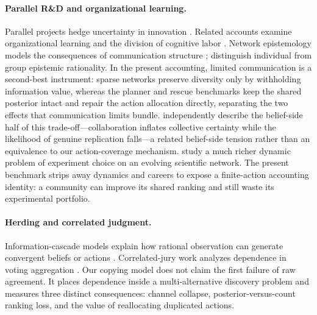 \documentclass[11pt]{article}
\theoremstyle{definition}
\theoremstyle{remark}
\newcommand{\1}{\mathbf{1}}
\begin{document}
\paragraph{Parallel R\&D and organizational learning.}
Parallel projects hedge uncertainty in innovation \citep{Nelson1961}. Related accounts examine organizational learning and the division of cognitive labor \citep{March1991,Kitcher1990}. Network epistemology models the consequences of communication structure \citep{Zollman2007}; \citet{MayoWilsonEtAl2011} distinguish individual from group epistemic rationality. In the present accounting, limited communication is a second-best instrument: sparse networks preserve diversity only by withholding information value, whereas the planner and rescue benchmarks keep the shared posterior intact and repair the action allocation directly, separating the two effects that communication limits bundle. \citet{DuedeEvans2024} independently describe the belief-side half of this trade-off---collaboration inflates collective certainty while the likelihood of genuine replication falls---a related belief-side tension rather than an equivalence to our action-coverage mechanism. \citet{RzhetskyEtAl2015} study a much richer dynamic problem of experiment choice on an evolving scientific network. The present benchmark strips away dynamics and careers to expose a finite-action accounting identity: a community can improve its shared ranking and still waste its experimental portfolio.

\paragraph{Herding and correlated judgment.}
Information-cascade models explain how rational observation can generate convergent beliefs or actions \citep{Banerjee1992,BikhchandaniEtAl1992,SmithSorensen2000}. Correlated-jury work analyzes dependence in voting aggregation \citep{Ladha1992}. Our copying model does not claim the first failure of raw agreement. It places dependence inside a multi-alternative discovery problem and measures three distinct consequences: channel collapse, posterior-versus-count ranking loss, and the value of reallocating duplicated actions.
\end{document}
